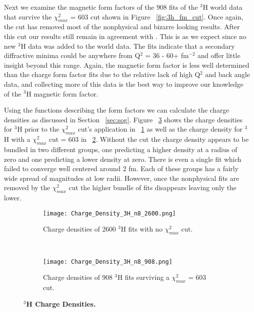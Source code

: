 Next we examine the magnetic form factors of the 908 fits of the $^3$H world data that survive the $\chi^2_{max}$ = 603 cut shown in Figure ~\ref{fig:3h_fm_cut}. Once again, the cut has removed most of the nonphysical and bizarre looking results. After this cut our results still remain in agreement with \cite{Article:Amroun}. This is as we expect since no new $^3$H data was added to the world data. The fits indicate that a secondary diffractive minima could be anywhere from Q$^2$ = 36 - 60+ fm$^{-2}$ and offer little insight beyond this range. Again, the magnetic form factor is less well determined than the charge form factor fits due to the relative lack of high Q$^2$ and back angle data, and collecting more of this data is the best way to improve our knowledge of the $^3$H magnetic form factor. 

Using the functions describing the form factors we can calculate the charge densities as discussed in Section ~\ref{sec:sog}. Figure ~\ref{fig:3h_charge_density} shows the charge densities for $^3$H prior to the $\chi^2_{max}$ cut's application in ~\ref{fig:3h_charge_density_no_cut} as well as the charge density for $^3$H with a $\chi^2_{max}$ cut = 603 in ~\ref{fig:3h_charge_density_cut}. Without the cut the charge density appears to be bundled in two different groups, one predicting a higher density at a radius of zero and one predicting a lower density at zero. There is even a single fit which failed to converge well centered around 2 fm. Each of these groups has a fairly wide spread of magnitudes at low radii. However, once the nonphysical fits are removed by the $\chi^2_{max}$ cut the higher bundle of fits disappears leaving only the lower. 

\begin{figure}[!ht]
\begin{subfigure}{1.\textwidth}
  \centering
  \texttt{[image: Charge\_Density\_3H\_n8\_2600.png]}
  \caption{Charge densities of 2600 $^3$H fits with no $\chi^2_{max}$ cut.}
  \label{fig:3h_charge_density_no_cut}
\end{subfigure}\\
\begin{subfigure}{1.\textwidth}
  \centering
  \texttt{[image: Charge\_Density\_3H\_n8\_908.png]}
  \caption{Charge densities of 908 $^3$H fits surviving a $\chi^2_{max}$ = 603 cut.}
  \label{fig:3h_charge_density_cut}
\end{subfigure}
\caption{\bf{$^3$H Charge Densities.}}
\label{fig:3h_charge_density}
\end{figure}

